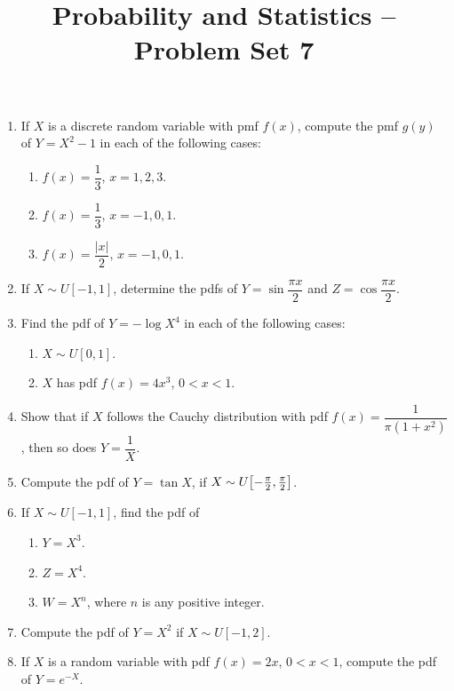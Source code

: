 \documentclass[svgnames]{amsart}
\title[]{Probability and Statistics -- Problem Set 7}
\begin{document}
\maketitle
\begin{enumerate}[leftmargin=*, itemsep=2mm]

\item If $X$ is a discrete random variable with pmf $f(x)$, compute the pmf $g(y)$ of $Y = X^2 - 1$ in each of the following cases:
\begin{enumerate}[itemsep=5pt]
    \item $f(x) = \dfrac 1 3$, $x = 1, 2, 3$.
    \item $f(x) = \dfrac 1 3$, $x = -1, 0, 1$.
    \item $f(x) = \dfrac{|x|}{2}$, $x = -1, 0, 1$.
\end{enumerate}

\item If $X \sim U[-1, 1]$, determine the pdfs of $Y = \sin \dfrac{\pi x}{2}$ and $Z = \cos \dfrac{\pi x}{2}$.

\item Find the pdf of $Y = - \log X^4$ in each of the following cases:
\begin{enumerate}
\item $X \sim U[0, 1]$.
\item $X$ has pdf $f(x) = 4x^3$, $0 < x < 1$.
\end{enumerate}

\item Show that if $X$ follows the Cauchy distribution with pdf $f(x) = \dfrac{1}{\pi (1 + x^2)}$, then so does $Y = \dfrac 1 X$.

\item Compute the pdf of $Y = \tan X$, if $X \sim U\bqty{-\frac \pi 2, \frac \pi 2}$.

\item If $X \sim U[-1, 1]$, find the pdf of
\begin{enumerate}
\item $Y = X^3$.
\item $Z = X^4$.
\item $W = X^n$, where $n$ is any positive integer.
\end{enumerate}

\item Compute the pdf of $Y = X^2$ if $X \sim U[-1, 2]$.

\item If $X$ is a random variable with pdf $f(x) = 2x$, $0 < x < 1$, compute the pdf of $Y = e^{-X}$.


\end{enumerate}
\end{document}
